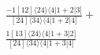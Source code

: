 \documentclass[varwidth, border=5pt]{standalone}
\begin{document}
\begin{my}
$\begin{gathered}
\scriptscriptstyle\frac{-1[12]⟨24⟩⟨4|1+2|3]}{[24]⟨34⟩⟨4|1+2|4]} +\\
\scriptscriptstyle\frac{1[13]⟨24⟩⟨4|1+3|2]}{[24]⟨34⟩⟨4|1+3|4]} \phantom{+}
\end{gathered}$
\end{my}
\end{document}

